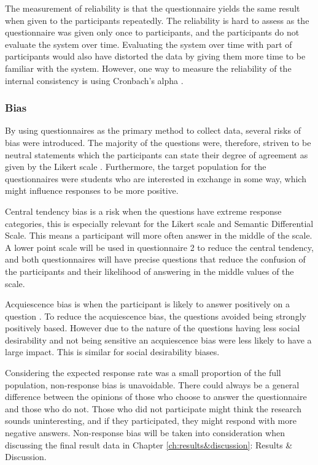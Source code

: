 The measurement of reliability is that the questionnaire yields the same result when given to the participants repeatedly. The reliability is hard to assess as the questionnaire was given only once to participants, and the participants do not evaluate the system over time. Evaluating the system over time with part of participants would also have distorted the data by giving them more time to be familiar with the system. However, one way to measure the reliability of the internal consistency is using Cronbach's alpha \cite{bland1997statistics}.

\subsubsection{Bias}

By using questionnaires as the primary method to collect data, several risks of bias were introduced. The majority of the questions were, therefore, striven to be neutral statements which the participants can state their degree of agreement as given by the Likert scale \cite{allen2007likert}. Furthermore, the target population for the questionnaires were students who are interested in exchange in some way, which might influence responses to be more positive. 

Central tendency bias is a risk when the questions have extreme response categories, this is especially relevant for the Likert scale and Semantic Differential Scale. This means a participant will more often answer in the middle of the scale. A lower point scale will be used in questionnaire 2 to reduce the central tendency, and both questionnaires will have precise questions that reduce the confusion of the participants and their likelihood of answering in the middle values of the scale. 

Acquiescence bias is when the participant is likely to answer positively on a question \cite{cronbach1946response}. To reduce the acquiescence bias, the questions avoided being strongly positively based. However due to the nature of the questions having less social desirability and not being sensitive an acquiescence bias were less likely to have a large impact.  This is similar for social desirability biases.  

Considering the expected response rate was a small proportion of the full population, non-response bias is unavoidable. There could always be a general difference between the opinions of those who choose to answer the questionnaire and those who do not. Those who did not participate might think the research sounds uninteresting, and if they participated, they might respond with more negative answers. Non-response bias will be taken into consideration when discussing the final result data in Chapter \ref{ch:results&discussion}: Results & Discussion.



